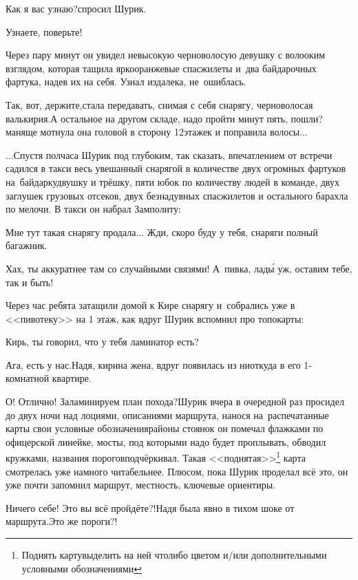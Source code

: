 \diagdash Как я вас узнаю?\mdash спросил Шурик.

\diagdash Узнаете, поверьте!

Через пару минут он увидел невысокую черноволосую девушку с волооким взглядом, которая тащила ярко\sdash оранжевые спасжилеты и~два байдарочных фартука, надев их на себя. Узнал издалека, не~ошиблась.

\diagdash Так, вот, держите,\mdash стала передавать, снимая с себя снарягу, черноволосая валькирия.\mdash А остальное на другом складе, надо пройти минут пять, пошли?\mdash маняще мотнула она головой в сторону 12\sdash этажек и поправила волосы$\ldots$

\vspace{0.5cm}
$\ldots$Спустя полчаса Шурик под глубоким, так сказать, впечатлением от встречи садился в такси весь увешанный снарягой в количестве двух огромных фартуков на~байдарку\sdash двушку и трёшку, пяти юбок по количеству людей в команде, двух заглушек грузовых отсеков, двух безнадувных спасжилетов и остального барахла по мелочи. В такси он набрал Замполиту:

\diagdash Мне тут такая снарягу продала$\ldots$ Жди, скоро буду у тебя, снаряги полный багажник.

\diagdash Хах, ты аккуратнее там со случайными связями! А~пивка, лад\'{ы} уж, оставим тебе, так и быть!

Через час ребята затащили домой к Кире снарягу и~собрались уже в <<пивотеку>> на 1 этаж, как вдруг Шурик вспомнил про топокарты:

\diagdash Кирь, ты говорил, что у тебя ламинатор есть?

\diagdash Ага, есть у нас.\mdash Надя, кирина жена, вдруг появилась из ниоткуда в его 1-комнатной квартире.

\renewcommand*{\thefootnote}{\fnsymbol{footnote}}
\diagdash О! Отлично! Заламинируем план похода?\mdash Шурик вчера в очередной раз просидел до двух ночи над лоциями, описаниями маршрута, нанося на~распечатанные карты свои условные обозначения\mdash районы стоянок он помечал флажками по офицерской линейке, мосты, под которыми надо будет проплывать, обводил кружками, названия порогов\mdash подчёркивал. Такая <<поднятая>>\footnote[1]{Поднять карту\mdash выделить на ней что\sdash либо цветом и/или дополнительными условными обозначениями} карта смотрелась уже намного читабельнее. Плюсом, пока Шурик проделал всё это, он уже почти запомнил маршрут, местность, ключевые ориентиры.

\diagdash Ничего себе! Это вы всё пройдёте?!\mdash Надя была явно в тихом шоке от маршрута.\mdash Это же пороги?!

